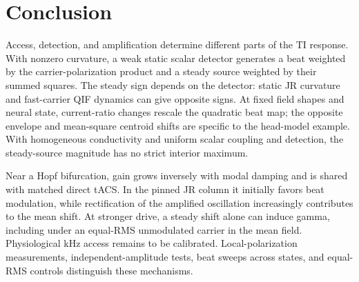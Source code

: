 \section{Conclusion}
Access, detection, and amplification determine different parts of the TI response. With nonzero curvature, a weak static
scalar detector generates a beat weighted by the carrier-polarization product
and a steady source weighted by their summed squares. The steady sign depends on the detector: static JR
curvature and fast-carrier QIF dynamics can give opposite signs. At fixed
field shapes and neural state, current-ratio changes rescale the quadratic beat map; the opposite
envelope and mean-square centroid shifts are specific to the head-model example.
With homogeneous conductivity and uniform scalar coupling and detection,
the steady-source magnitude has no strict interior maximum.

Near a Hopf bifurcation, gain grows inversely with modal damping and is shared
with matched direct tACS. In the pinned JR column it initially
favors beat modulation, while rectification of the amplified oscillation
increasingly contributes to the mean shift.
At stronger drive, a steady shift alone can induce gamma, including under an
equal-RMS unmodulated carrier in the mean field. Physiological kHz access remains
to be calibrated. Local-polarization measurements, independent-amplitude tests,
beat sweeps across states, and equal-RMS controls distinguish these mechanisms.

